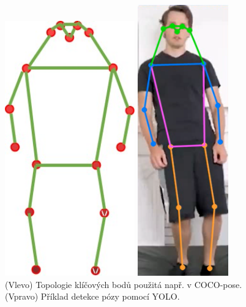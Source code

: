 \begin{figure}[]
    \centering
    \begin{minipage}{0.48\textwidth}
        \centering
        \includegraphics[width=0.5\textwidth]{Figures/keypoints.png}
    \end{minipage}
    \hfill
    \begin{minipage}{0.48\textwidth}
        \centering
        \includegraphics[width=0.35\textwidth]{Figures/pose1.png}
    \end{minipage}
    \caption{(Vlevo) Topologie klíčových bodů použitá např. v COCO-pose.\cite{2dhpe} (Vpravo) Příklad detekce pózy pomocí YOLO.}
    \label{fig:keypoints}
\end{figure}

